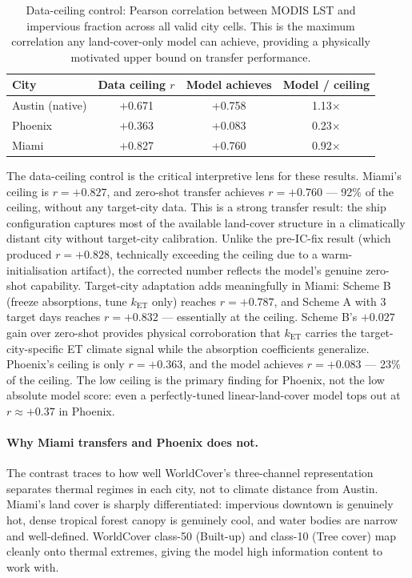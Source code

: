 \documentclass[12pt, letterpaper]{article}
\begin{document}
\begin{table}[ht]
  \centering
  \caption{Data-ceiling control: Pearson correlation between MODIS LST and
  impervious fraction across all valid city cells. This is the maximum
  correlation any land-cover-only model can achieve, providing a
  physically motivated upper bound on transfer performance.}
  \label{tab:data_ceiling}
  \begin{tabular}{lccc}
    \toprule
    City & Data ceiling $r$ & Model achieves & Model / ceiling \\
    \midrule
    Austin (native)  & +0.671 & +0.758 & 1.13$\times$ \\
    Phoenix          & +0.363 & +0.083 & 0.23$\times$ \\
    Miami            & +0.827 & +0.760 & 0.92$\times$ \\
    \bottomrule
  \end{tabular}
\end{table}

The data-ceiling control is the critical interpretive lens for these
results. Miami's ceiling is $r = +0.827$, and zero-shot transfer achieves
$r = +0.760$ — 92\% of the ceiling, without any target-city data. This
is a strong transfer result: the ship configuration captures most of the
available land-cover structure in a climatically distant city without
target-city calibration. Unlike the pre-IC-fix result (which produced
$r = +0.828$, technically exceeding the ceiling due to a warm-initialisation
artifact), the corrected number reflects the model's genuine zero-shot
capability. Target-city adaptation adds meaningfully in Miami: Scheme B
(freeze absorptions, tune $k_{\mathrm{ET}}$ only) reaches $r = +0.787$,
and Scheme A with 3 target days reaches $r = +0.832$ — essentially at the
ceiling. Scheme B's $+0.027$ gain over zero-shot provides physical
corroboration that $k_{\mathrm{ET}}$ carries the target-city-specific ET
climate signal while the absorption coefficients generalize.
Phoenix's ceiling is only $r = +0.363$, and the model achieves $r =
+0.083$ — 23\% of the ceiling. The low ceiling is the primary finding
for Phoenix, not the low absolute model score: even a perfectly-tuned
linear-land-cover model tops out at $r \approx +0.37$ in Phoenix.

\paragraph{Why Miami transfers and Phoenix does not.}
The contrast traces to how well WorldCover's three-channel representation
separates thermal regimes in each city, not to climate distance from
Austin. Miami's land cover is sharply differentiated: impervious downtown
is genuinely hot, dense tropical forest canopy is genuinely cool, and
water bodies are narrow and well-defined. WorldCover class-50 (Built-up)
and class-10 (Tree cover) map cleanly onto thermal extremes, giving the
model high information content to work with.
\end{document}
